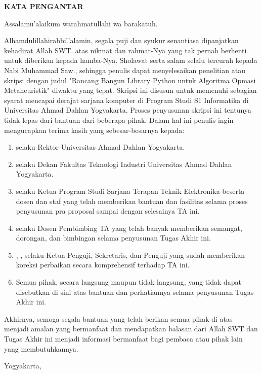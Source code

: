 
\clearpage
{}
{}
\begin{center}
    \textbf{\large KATA PENGANTAR}\\[3em]
\end{center}

\noindent Assalamu'alaikum warahmatullahi wa barakatuh.

Alhamdulillahirabbil'alamin, segala puji dan syukur senantiasa dipanjatkan kehadirat Allah SWT. atas nikmat dan rahmat-Nya yang tak pernah berhenti untuk diberikan kepada hamba-Nya. Sholawat serta salam selalu tercurah kepada Nabi Muhammad Saw., sehingga penulis dapat menyelesaikan penelitian atau skripsi dengan judul "Rancang Bangun Library Python untuk Algoritma Opmasi Metaheuristik" diwaktu yang tepat. Skripsi ini disusun untuk memenuhi sebagian syarat mencapai derajat sarjana komputer di Program Studi S1 Informatika di Universitas Ahmad Dahlan Yogyakarta. Proses penyusunan skripsi ini tentunya tidak lepas dari bantuan dari beberapa pihak. Dalam hal ini penulis ingin mengucapkan terima kasih yang sebesar-besarnya kepada:

\begin{enumerate}
    \item {\rektor} selaku Rektor Universitas Ahmad Dahlan Yogyakarta.
    \item {\dekan} selaku Dekan Fakultas Teknologi Industri Universitas Ahmad Dahlan Yogyakarta.
    \item {\koorprodi} selaku Ketua Program Studi Sarjana Terapan Teknik Elektronika beserta dosen dan staf yang telah memberikan bantuan dan fasilitas selama proses penyusunan pra proposal sampai dengan selesainya TA ini.
    \item {\pembimbing} selaku Dosen Pembimbing TA yang telah banyak memberikan semangat, dorongan, dan bimbingan selama penyusunan Tugas Akhir ini.
    \item {\pembimbing}, {\pengujiSatu}, {\pengujiDua} selaku Ketua Penguji, Sekretaris, dan Penguji yang sudah  memberikan koreksi perbaikan secara komprehensif terhadap TA ini.
    \item Semua pihak, secara langsung maupun tidak langsung, yang tidak dapat disebutkan di sini atas bantuan dan perhatiannya selama penyusunan Tugas Akhir ini.
\end{enumerate}

Akhirnya, semoga segala bantuan yang telah berikan semua pihak di atas menjadi amalan yang bermanfaat dan mendapatkan balasan dari Allah SWT dan Tugas Akhir ini menjadi informasi bermanfaat bagi pembaca atau pihak lain yang membutuhkannya.

\begin{flushright}
    Yogyakarta, \tglpengesahan\\[1.25cm]
    \penulis \\
    \nim
\end{flushright}
